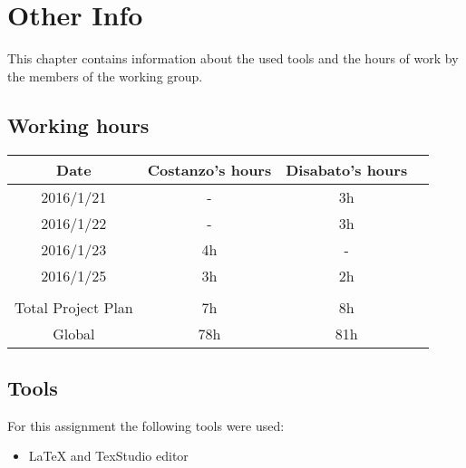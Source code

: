 \documentclass[\mainpath/main]{subfiles}
\begin{document}
\chapter{Other Info}
\label{OtherInfo}

\setmyfancystyle

This chapter contains information about the used tools and the hours of work by the members of the working group.

\section{Working hours}
\begin{table}[h!]
	\centering
\begin{tabular}{cccc}
\hline
Date     	& Costanzo's hours & Disabato's hours  & \\ \hline
2016/1/21 	& -			  	   & 3h 			   & \\ \hline
2016/1/22 	& -			  	   & 3h 			   & \\ \hline
2016/1/23   & 4h               & -                 & \\ \hline
2016/1/25   & 3h             & 2h                & \\ \hline
\\
Total Project Plan  & 7h 		 	   & 8h 			   & \\ \hline
Global 	    & 78h 		 	   & 81h 			   & \\ \hline

\end{tabular}
\end{table}

\section{Tools}
For this assignment the following tools were used:
\begin{itemize}
	\item \LaTeX{} and TexStudio editor
\end{itemize}
\end{document}
